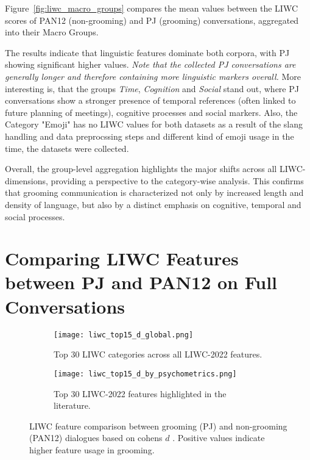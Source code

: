 Figure~\ref{fig:liwc_macro_groups} compares the mean values between the LIWC scores of PAN12 (non-grooming) and PJ (grooming) conversations, aggregated into their Macro Groups.

The results indicate that linguistic features dominate both corpora, with PJ showing significant higher values. \textit{Note that the collected PJ conversations are generally longer and therefore containing more linguistic markers overall.} More interesting is, that the groups \textit{Time}, \textit{Cognition} and \textit{Social} stand out, where PJ conversations show a stronger presence of temporal references (often linked to future planning of meetings), cognitive processes and social markers. Also, the Category "Emoji" has no LIWC values for both datasets as a result of the slang handling and data preprocssing steps and different kind of emoji usage in the time, the datasets were collected.

Overall, the group-level aggregation highlights the major shifts across all LIWC-dimensions, providing a perspective to the category-wise analysis. This confirms that grooming communication is  characterized not only by increased length and density of language, but also by a distinct emphasis on cognitive, temporal and social processes.


\section{Comparing LIWC Features between PJ and PAN12 on Full Conversations} \label{sec:liwc_global_analysis}

\begin{figure}[ht]
    \centering
    \begin{subfigure}[t]{0.48\textwidth}
        \centering
        \texttt{[image: liwc\_top15\_d\_global.png]}
        \caption{Top 30 LIWC categories across all LIWC-2022 features.}
    \end{subfigure}
    \hfill
    \begin{subfigure}[t]{0.48\textwidth}
        \centering
        \texttt{[image: liwc\_top15\_d\_by\_psychometrics.png]}
        \caption{Top 30 LIWC-2022 features highlighted in the literature.}
    \end{subfigure}
    \caption[LIWC feature Comparison (PJ, PAN12) over Complete Conversations]{LIWC feature comparison between grooming (PJ) and non-grooming (PAN12) dialogues based on cohens $d$ \cite{cohen1988}. Positive values indicate higher feature usage in grooming.}
    \label{fig:liwc_global_analysis}
\end{figure}


